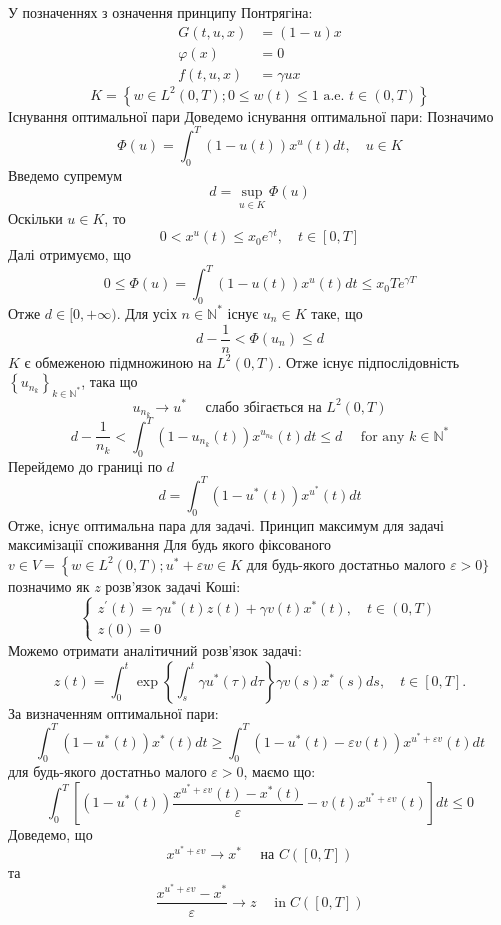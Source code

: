 \documentclass[a4paper,12pt]{extreport}
\begin{document}
У позначеннях з означення принципу Понтрягіна:
$$
\begin{aligned}
G(t, u, x) &=(1-u) x \\
\varphi(x) &=0 \\
f(t, u, x) &=\gamma u x
\end{aligned}
$$$$
K=\left\{w \in L^2(0, T) ; 0 \leq w(t) \leq 1 \text { a.e. } t \in(0, T)\right\}
$$
Існування оптимальної пари
Доведемо існування оптимальної пари:
Позначимо 
\begin{equation} \label{eq:4_10}
\Phi(u)=\int_0^T(1-u(t)) x^u(t) d t, \quad u \in K
\end{equation}
Введемо супремум
$$
d=\sup _{u \in K} \Phi(u)
$$
Оскільки $u \in K$, то
$$
0<x^u(t) \leq x_0 e^{\gamma t}, \quad t \in[0, T]
$$
Далі отримуємо, що 
$$
0 \leq \Phi(u)=\int_0^T(1-u(t)) x^u(t) d t \leq x_0 T e^{\gamma T}
$$
Отже $d \in[0,+\infty)$.
Для усіх $n \in \mathbb{N}^*$ існує $u_n \in K$ таке, що 
$$
d-\frac{1}{n}<\Phi\left(u_n\right) \leq d
$$
$K$ є обмеженою підмножиною на $L^2(0, T)$. Отже існує підпослідовність $\left\{u_{n_k}\right\}_{k \in \mathbb{N}^*}$, така що
$$
u_{n_k} \longrightarrow u^* \quad \text { слабо збігається на } L^2(0, T)
$$
$$
d-\frac{1}{n_k}<\int_0^T\left(1-u_{n_k}(t)\right) x^{u_{n_k}}(t) d t \leq d \quad \text { for any } k \in \mathbb{N}^*
$$
Перейдемо до границі по $d$
$$
d=\int_0^T\left(1-u^*(t)\right) x^{u^*}(t) d t
$$Отже, існує оптимальна пара для задачі.
Принцип максимум для задачі максимізації споживання
Для будь якого фіксованого  $v \in V=\left\{w \in L^2(0, T) ; u^*+\varepsilon w \in\right. K \text { для будь-якого достатньо малого } \varepsilon>0 \}$ позначимо як  $z$ розв'язок задачі Коші:
$$
\left\{\begin{array}{l}
z^{\prime}(t)=\gamma u^*(t) z(t)+\gamma v(t) x^*(t), \quad t \in(0, T) \\
z(0)=0
\end{array}\right.
$$
Можемо отримати аналітичний розв'язок задачі:
$$
z(t)=\int_0^t \exp \left\{\int_s^t \gamma u^*(\tau) d \tau\right\} \gamma v(s) x^*(s) d s, \quad t \in[0, T] .
$$
За визначенням оптимальної пари:
$$
\int_0^T\left(1-u^*(t)\right) x^*(t) d t \geq \int_0^T\left(1-u^*(t)-\varepsilon v(t)\right) x^{u^*+\varepsilon v}(t) d t
$$
для будь-якого достатньо малого $\varepsilon>0$, маємо що:
$$
\int_0^T\left[\left(1-u^*(t)\right) \frac{x^{u^*+\varepsilon v}(t)-x^*(t)}{\varepsilon}-v(t) x^{u^*+\varepsilon v}(t)\right] d t \leq 0
$$
Доведемо, що 
$$
x^{u^*+\varepsilon v} \longrightarrow x^* \quad \text { на } C([0, T])
$$
та
$$
\frac{x^{u^*+\varepsilon v}-x^*}{\varepsilon} \longrightarrow z \quad \operatorname{in} C([0, T])
$$
\end{document}
